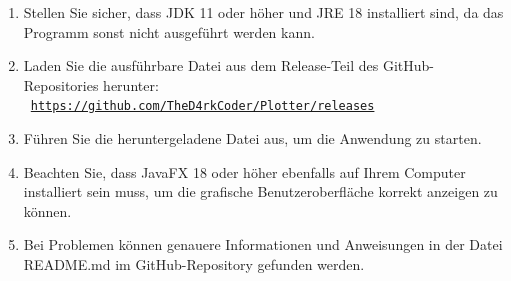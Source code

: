 \documentclass[a4paper]{article}
\begin{document}
\begin{enumerate}
	\item Stellen Sie sicher, dass JDK 11 oder höher und JRE 18 installiert sind, da das Programm sonst nicht ausgeführt werden kann.
	\item Laden Sie die ausführbare Datei aus dem Release-Teil des GitHub-Repositories herunter: \
	      \texttt{\href{https://github.com/TheD4rkCoder/Plotter/releases}{https://github.com/TheD4rkCoder/Plotter/releases}}
	\item Führen Sie die heruntergeladene Datei aus, um die Anwendung zu starten.
	\item Beachten Sie, dass JavaFX 18 oder höher ebenfalls auf Ihrem Computer installiert sein muss, um die grafische Benutzeroberfläche korrekt anzeigen zu können.
	\item Bei Problemen können genauere Informationen und Anweisungen in der Datei README.md im GitHub-Repository gefunden werden. \
\end{enumerate}
\end{document}
